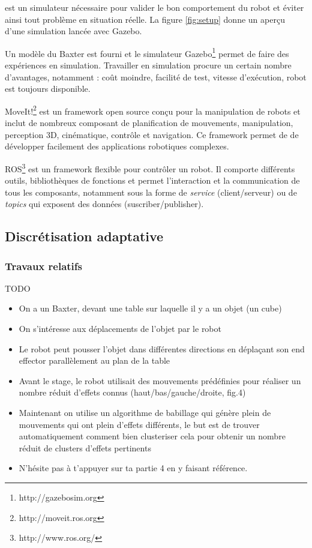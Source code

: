 \documentclass{llncs}
\begin{document}
 est un simulateur nécessaire pour valider le bon comportement du robot et éviter ainsi tout problème en situation réelle.
La figure \ref{fig:setup} donne un aperçu d'une simulation lancée avec Gazebo.

Un modèle du Baxter est fourni et le simulateur Gazebo\footnote{http://gazebosim.org} permet de faire des expériences en simulation. 
Travailler en simulation procure un certain nombre d'avantages, notamment : coût moindre, facilité de test, vitesse d'exécution, robot est toujours disponible.

MoveIt!\footnote{http://moveit.ros.org} est un framework open source conçu pour la manipulation de robots et inclut de nombreux composant de planification de mouvements, manipulation, perception 3D, cinématique, contrôle et navigation.
Ce framework permet de de développer facilement des applications robotiques complexes.

ROS\footnote{http://www.ros.org/} est un framework flexible pour contrôler un robot.
Il comporte différents outils, bibliothèques de fonctions et permet l'interaction et la communication de tous les composants, notamment sous la forme de \textit{service} (client/serveur) ou de \textit{topics} qui exposent des données (suscriber/publisher).






\subsection{Discrétisation adaptative}


\subsubsection{Travaux relatifs}

TODO
\begin{itemize}
  \item On a un Baxter, devant une table sur laquelle il y a un objet (un cube)
  \item On s'intéresse aux déplacements de l'objet par le robot
  \item Le robot peut pousser l'objet dans différentes directions en déplaçant son end effector parallèlement au plan de la table
  \item Avant le stage, le robot utilisait des mouvements prédéfinies pour réaliser un nombre réduit d'effets connus (haut/bas/gauche/droite, fig.4)
  \item Maintenant on utilise un algorithme de babillage qui génère plein de mouvements qui ont plein d'effets différents, le but est de trouver automatiquement comment bien clusteriser cela pour obtenir un nombre réduit de clusters d'effets pertinents
  \item N'hésite pas à t'appuyer sur ta partie 4 en y faisant référence.
\end{itemize}
\end{document}
